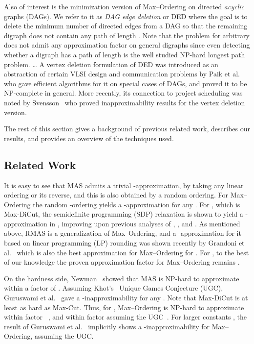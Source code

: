\documentclass[oribibl]{llncs}
\newcommand{\mas}{{\sc MAS}\xspace}
\newcommand{\maxk}{{\sc Max--Ordering}\xspace}
\newcommand{\maxdi}{{\sc Max-DiCut}\xspace}
\newcommand{\mink}{{\sc DED}\xspace}
\newcommand{\rmas}{{\sc RMAS}\xspace}
\begin{document}
Also of interest is the minimization version of \maxk on directed
\emph{acyclic} graphs (DAGs). We refer to it as \emph{DAG edge
deletion} or \mink where the goal is to
delete the minimum number of directed edges from a DAG so that the
remaining digraph does not contain any path of length . Note that
the problem for arbitrary  does not admit any approximation factor on
general digraphs since even detecting whether a digraph has a 
path of length  is the well studied NP-hard longest path problem. …
A vertex deletion formulation of
\mink was introduced as an abstraction of
certain VLSI design and communication problems by Paik et
al.~\cite{paik1994deleting} who gave efficient algorithms for it on special
cases of DAGs, and proved it to be NP-complete in general. More recently,
its connection to project scheduling was noted 
by Svensson~\cite{svensson2012hardness} who proved 
inapproximability results for
the vertex deletion version. 
  
The rest of this section gives a background of previous related work,
describes our results, and provides an overview of the techniques
used.

\subsection{Related Work}
It is easy to see that \mas admits a trivial -approximation, by
taking any linear ordering or its reverse, and this is also obtained by a random
ordering.
For \maxk the random -ordering yields a
-approximation for any . For
, which is \maxdi, the semidefinite programming (SDP) 
relaxation is shown to yield a -approximation in \cite{lewin2002improved}, improving upon previous analyses of
\cite{matuura20010},  \cite{zwick2000analyzing}, and \cite{FeigeGoemans}. 
As mentioned above, \rmas is a generalization
of \maxk, and a -approximation for it
based on linear programming (LP) 
rounding was shown recently by Grandoni et al.~\cite{grandoni2015lp}
which is also the best approximation for \maxk for . 
For , to the best of our knowledge the proven
approximation factor for \maxk remains . 

On the hardness side, Newman~\cite{newman2000approximating} showed that 
\mas is NP-hard to
approximate within a factor of . Assuming
Khot's~\cite{khot2002power} Unique
Games Conjecture (UGC), Guruswami et al.~\cite{guruswami2008beating} gave a
-inapproximability for any .
Note that \maxdi is at least as hard as {\sc Max-Cut}. Thus, 
for , \maxk is NP-hard to
approximate within factor ~\cite{hastad2001some},
and within factor   assuming the UGC~\cite{khot2007optimal}. 
For larger constants , the
result of Guruswami et al.~\cite{guruswami2008beating} implicitly shows a
-inapproximability for \maxk, assuming the UGC.
\end{document}
